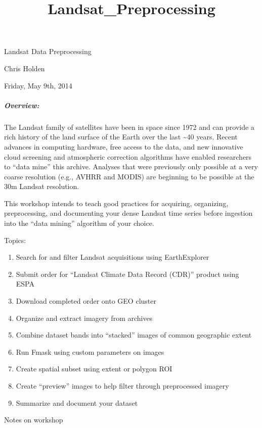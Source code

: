 \documentclass{article}
\title{Landsat\_Preprocessing}
\begin{document}
    
    
    \maketitle
    
    

    
    Landsat Data Preprocessing

Chris Holden

Friday, May 9th, 2014

\subparagraph{Overview:}\label{overview}

The Landsat family of satellites have been in space since 1972 and can
provide a rich history of the land surface of the Earth over the last
\textasciitilde{}40 years. Recent advances in computing hardware, free
access to the data, and new innovative cloud screening and atmospheric
correction algorithms have enabled researchers to ``data mine'' this
archive. Analyses that were previously only possible at a very coarse
resolution (e.g., AVHRR and MODIS) are beginning to be possible at the
30m Landsat resolution.

This workshop intends to teach good practices for acquiring, organizing,
preprocessing, and documenting your dense Landsat time series before
ingestion into the ``data mining'' algorithm of your choice.

Topics:

\begin{enumerate}
\def\labelenumi{\arabic{enumi}.}
\itemsep1pt\parskip0pt
\item
  Search for and filter Landsat acquisitions using EarthExplorer
\item
  Submit order for ``Landsat Climate Data Record (CDR)'' product using
  ESPA
\item
  Download completed order onto GEO cluster
\item
  Organize and extract imagery from archives
\item
  Combine dataset bands into ``stacked'' images of common geographic
  extent
\item
  Run Fmask using custom parameters on images
\item
  Create spatial subset using extent or polygon ROI
\item
  Create ``preview'' images to help filter through preprocessed imagery
\item
  Summarize and document your dataset
\end{enumerate}

Notes on workshop
\end{document}
